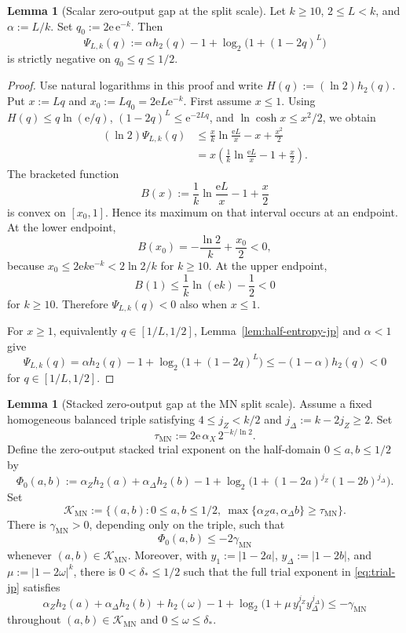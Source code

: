 \documentclass[11pt]{article}
\theoremstyle{definition}
\newtheorem{lemma}[theorem]{Lemma}
\newcommand{\h}{h_2}
\begin{document}
\begin{lemma}[Scalar zero-output gap at the split scale]\label{lem:scalar-zero-output-gap-jp}
Let \(k\ge10\), \(2\le L<k\), and \(\alpha:=L/k\). Set \(q_0:=2\mathrm{e}\,\mathrm{e}^{-k}\). Then
\[
\Psi_{L,k}(q):=
\alpha\h(q)-1+\log_2\!\bigl(1+(1-2q)^L\bigr)
\]
is strictly negative on \(q_0\le q\le1/2\).
\end{lemma}

\begin{proof}
Use natural logarithms in this proof and write \(H(q):=(\ln2)\h(q)\). Put \(x:=Lq\) and \(x_0:=Lq_0=2\mathrm{e} L\mathrm{e}^{-k}\).
First assume \(x\le1\). Using \(H(q)\le q\ln(\mathrm{e}/q)\), \((1-2q)^L\le \mathrm{e}^{-2Lq}\), and
\(\ln\cosh x\le x^2/2\), we obtain
\[
\begin{aligned}
(\ln2)\Psi_{L,k}(q)
&\le
\frac{x}{k}\ln\frac{\mathrm{e}L}{x}
-x+\frac{x^2}{2}  \\
&=
x\left(\frac1k\ln\frac{\mathrm{e}L}{x}-1+\frac{x}{2}\right).
\end{aligned}
\]
The bracketed function
\[
B(x):=\frac1k\ln\frac{\mathrm{e}L}{x}-1+\frac{x}{2}
\]
is convex on \([x_0,1]\). Hence its maximum on that interval occurs at an endpoint. At the lower endpoint,
\[
B(x_0)
=-\frac{\ln2}{k}+\frac{x_0}{2}<0,
\]
because \(x_0\le2\mathrm{e} k \mathrm{e}^{-k}<2\ln2/k\) for \(k\ge10\). At the upper endpoint,
\[
B(1)\le \frac1k\ln(\mathrm{e}k)-\frac12<0
\]
for \(k\ge10\). Therefore \(\Psi_{L,k}(q)<0\) also when \(x\le1\).

For \(x\ge1\), equivalently \(q\in[1/L,1/2]\),
Lemma~\ref{lem:half-entropy-jp} and \(\alpha<1\) give
\[
\Psi_{L,k}(q)
=
\alpha\h(q)-1+\log_2\!\bigl(1+(1-2q)^L\bigr)
\le
-(1-\alpha)\h(q)<0
\]
for \(q\in[1/L,1/2]\).
\end{proof}

\begin{lemma}[Stacked zero-output gap at the MN split scale]\label{lem:stacked-zero-output-gap-jp}
Assume a fixed homogeneous balanced triple satisfying \(4\le j_Z<k/2\) and \(j_\Delta:=k-2j_Z\ge2\).
Set
\[
\tau_{\mathrm{MN}}:=2\mathrm{e}\,\alpha_X\,2^{-k/\ln 2}.
\]
Define the zero-output stacked trial exponent on the half-domain \(0\le a,b\le1/2\) by
\[
\Phi_0(a,b)
:=
\alpha_Z\h(a)+\alpha_\Delta\h(b)-1
+\log_2\!\bigl(1+(1-2a)^{j_Z}(1-2b)^{j_\Delta}\bigr).
\]
Set
\[
\mathcal K_{\mathrm{MN}}
:=
\{(a,b):0\le a,b\le1/2,\ \max\{\alpha_Za,\alpha_\Delta b\}\ge\tau_{\mathrm{MN}}\}.
\]
There is \(\gamma_{\mathrm{MN}}>0\), depending only on the triple, such that
\[
\Phi_0(a,b)\le -2\gamma_{\mathrm{MN}}
\]
whenever \((a,b)\in\mathcal K_{\mathrm{MN}}\).
Moreover, with \(y_1:=|1-2a|\), \(y_\Delta:=|1-2b|\), and \(\mu:=|1-2\omega|^k\), there is \(0<\delta_*\le1/2\) such that the full trial exponent in \eqref{eq:trial-jp} satisfies
\[
\alpha_Z\h(a)+\alpha_\Delta\h(b)+\h(\omega)-1
+\log_2\!\bigl(1+\mu\,y_1^{j_Z}y_\Delta^{j_\Delta}\bigr)
\le-\gamma_{\mathrm{MN}}
\]
throughout \((a,b)\in\mathcal K_{\mathrm{MN}}\) and \(0\le\omega\le\delta_*\).
\end{lemma}
\end{document}
